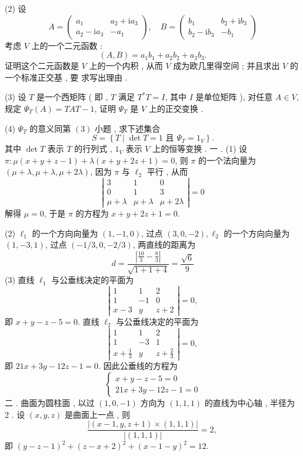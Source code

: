 \documentclass[10pt]{article}
\begin{document}
(2)  设 
$$
A=\left(\begin{array}{cc}
a_{1} & a_{2}+\mathrm{i} a_{3} \\
a_{2}-\mathrm{i} a_{3} & -a_{1}
\end{array}\right), \quad B=\left(\begin{array}{cc}
b_{1} & b_{2}+\mathrm{i} b_{3} \\
b_{2}-\mathrm{i} b_{3} & -b_{1}
\end{array}\right)
$$
 考虑  $V$  上的一个二元函数 :
$$
(A, B)=a_{1} b_{1}+a_{2} b_{2}+a_{3} b_{3} .
$$
 证明这个二元函数是  $V$  上的一个内积 ,  从而  $V$  成为欧几里得空间 ;  并且求出  $V$  的一个标准正交基 ,  要   求写出理由 .

(3)  设  $T$  是一个西矩阵  ( 即 , $T$  满足  $T^{*} T=I$,  其中  $I$  是单位矩阵 ),  对任意  $A \in V$,  规定  $\Psi_{T}(A)=T A T-1$,  证明  $\Psi_{T}$  是  $V$  上的正交变换 .

(4) $\Psi_{T}$  的意义同第  $(3)$  小题 ,  求下述集合 
$$
S=\left\{T \mid \operatorname{det} T=1 \text { 且 } \Psi_{T}=1_{V}\right\} .
$$
 其中  $\operatorname{det} T$  表示  $T$  的行列式 , $1_{V}$  表示  $V$  上的恒等变换 .  一 . (1)  设  $\pi: \mu(x+y+z-1)+\lambda(x+y+2 z+1)=0$,  则  $\pi$  的一个法向量为  $(\mu+\lambda, \mu+\lambda, \mu+2 \lambda)$,  因为  $\pi$  与  $\ell_{2}$  平行 ,  从而 
$$
\left|\begin{array}{ccc}
3 & 1 & 0 \\
0 & 1 & 3 \\
\mu+\lambda & \mu+\lambda & \mu+2 \lambda
\end{array}\right|=0
$$
 解得  $\mu=0$,  于是  $\pi$  的方程为  $x+y+2 z+1=0$.

(2) $\ell_{1}$  的一个方向向量为  $(1,-1,0)$,  过点  $(3,0,-2), \ell_{2}$  的一个方向向量为  $(1,-3,1)$,  过点  $(-1 / 3,0,-2 / 3)$,  两直线的距离为 
$$
d=\frac{\left|\frac{10}{3}-\frac{8}{3}\right|}{\sqrt{1+1+4}}=\frac{\sqrt{6}}{9}
$$
(3)  直线  $\ell_{1}$  与公垂线决定的平面为 
$$
\left|\begin{array}{ccc}
1 & 1 & 2 \\
1 & -1 & 0 \\
x-3 & y & z+2
\end{array}\right|=0,
$$
 即  $x+y-z-5=0$.  直线  $\ell_{2}$  与公垂线决定的平面为 
$$
\left|\begin{array}{ccc}
1 & 1 & 2 \\
1 & -3 & 1 \\
x+\frac{1}{3} & y & z+\frac{2}{3}
\end{array}\right|=0,
$$
 即  $21 x+3 y-12 z-1=0$.  因此公垂线的方程为 
$$
\left\{\begin{array}{r}
x+y-z-5=0 \\
21 x+3 y-12 z-1=0
\end{array}\right.
$$
 二 .  曲面为圆柱面 ,  以过  $(1,0,-1)$  方向为  $(1,1,1)$  的直线为中心轴 ,  半径为  2 .  设  $(x, y, z)$  是曲面上一点 ,  则 
$$
\frac{|(x-1, y, z+1) \times(1,1,1)|}{|(1,1,1)|}=2 \text {, }
$$
 即  $(y-z-1)^{2}+(z-x+2)^{2}+(x-1-y)^{2}=12$.
\end{document}
